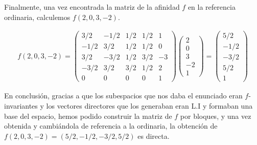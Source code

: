 \pagebreak

Finalmente, una vez encontrada la matriz de la afinidad $f$ en la referencia ordinaria, calculemos $f(2,0,3,-2)$.

\begin{gather*}
    f(2,0,3,-2) =
    \begin{pmatrix}
    3/2 & -1/2 & 1/2 & 1/2 & 1\\
    -1/2 & 3/2 & 1/2 & 1/2 & 0\\
    3/2 & -3/2 & 1/2 & 3/2 & -3\\
    -3/2 & 3/2 & 3/2 & 1/2 & 2\\
    0 & 0 & 0 & 0 & 1
    \end{pmatrix}
    \begin{pmatrix}
    2\\ 0\\ 3\\ -2\\ 1
    \end{pmatrix}
    =
    \begin{pmatrix}
    5/2\\ -1/2\\ -3/2\\ 5/2\\ 1
    \end{pmatrix}
\end{gather*}
\vspace{3mm}

En conclusión, gracias a que los subespacios que nos daba el enunciado eran $f$-invariantes y los vectores directores que los generaban eran L.I y formaban una base del espacio, hemos podido construir la matriz de $f$ por bloques, y una vez obtenida y cambiándola de referencia a la ordinaria, la obtención de $f(2,0,3,-2) =  (5/2, -1/2, -3/2, 5/2)$ es directa.